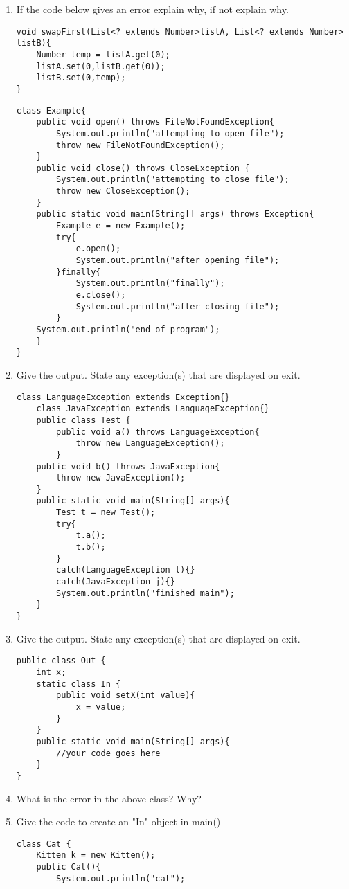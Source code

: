 \documentclass{article}
\begin{document}
\begin{enumerate}
	\item If the code below gives an error explain why, if not explain why.
\begin{lstlisting}
void swapFirst(List<? extends Number>listA, List<? extends Number> listB){
	Number temp = listA.get(0);
 	listA.set(0,listB.get(0));
	listB.set(0,temp);
}
\end{lstlisting}
\begin{lstlisting}
class Example{
 	public void open() throws FileNotFoundException{
  		System.out.println("attempting to open file");
  		throw new FileNotFoundException();
 	}
 	public void close() throws CloseException {
  		System.out.println("attempting to close file");
  		throw new CloseException();
 	}
 	public static void main(String[] args) throws Exception{
  		Example e = new Example();
  		try{ 
   			e.open();
   			System.out.println("after opening file");
  		}finally{ 
   			System.out.println("finally");
   			e.close();
   			System.out.println("after closing file");
  		}
  	System.out.println("end of program");
	}
}
\end{lstlisting}
	\item Give the output. State any exception(s) that are displayed on exit.
	\newpage
\begin{lstlisting}
class LanguageException extends Exception{}
	class JavaException extends LanguageException{}
	public class Test {
 		public void a() throws LanguageException{
  			throw new LanguageException();
 		}
 	public void b() throws JavaException{
  		throw new JavaException();
 	}
 	public static void main(String[] args){
  		Test t = new Test(); 
  		try{
   			t.a();
   			t.b();
  		}
  		catch(LanguageException l){}
  		catch(JavaException j){}
  		System.out.println("finished main");
 	}
}
\end{lstlisting}
	\item Give the output. State any exception(s) that are displayed on exit.
\begin{lstlisting}
public class Out {
 	int x;
 	static class In {
  		public void setX(int value){
   			x = value;
  		}
 	}
 	public static void main(String[] args){
  		//your code goes here
 	}
}
\end{lstlisting}
	\item What is the error in the above class? Why?
	\item Give the code to create an "In" object in main()
	\newpage
\begin{lstlisting}
class Cat {
 	Kitten k = new Kitten();
 	public Cat(){
  		System.out.println("cat");

\end{lstlisting}
\end{enumerate}
\end{document}
